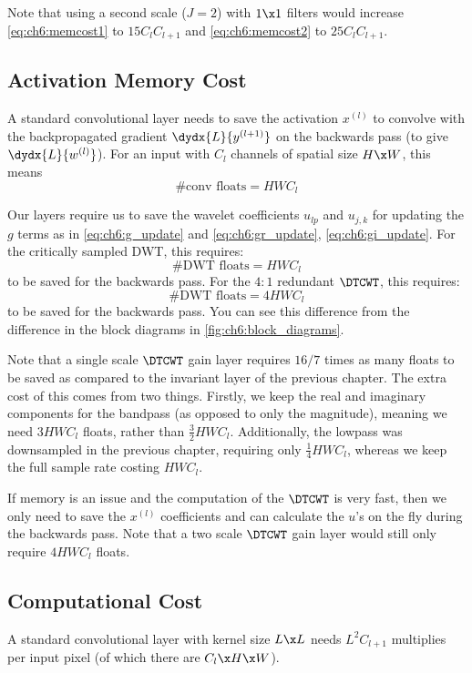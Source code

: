 Note that using a second scale ($J=2$) with $1\x 1$ filters would increase
\eqref{eq:ch6:memcost1} to $15C_lC_{l+1}$ and \eqref{eq:ch6:memcost2} to
$25C_lC_{l+1}$.  

\subsection{Activation Memory Cost}\label{sec:ch6:act_memory}
A standard convolutional layer needs to save the activation $x^{(l)}$ to
convolve with the backpropagated gradient $\dydx{L}{y^{(l+1)}}$ on the backwards
pass (to give $\dydx{L}{w^{(l)}}$). For an input with $C_l$ channels of spatial
size $H\x W$, this means
%
\begin{equation}
  \text{#conv floats} = HWC_l 
\end{equation}

Our layers require us to save the wavelet coefficients $u_{lp}$ and  $u_{j,k}$
for updating the $g$ terms as in \eqref{eq:ch6:g_update} and
\eqref{eq:ch6:gr_update}, \eqref{eq:ch6:gi_update}.  For the critically sampled
DWT, this requires:
%
\begin{equation}
  \text{#DWT floats} = HWC_l 
\end{equation}
%
to be saved for the backwards pass. For the $4:1$ redundant $\DTCWT$, this 
requires:
%
\begin{equation}
  \text{#DWT floats} = 4HWC_l 
\end{equation}
%
to be saved for the backwards pass.  You can see this difference from the
difference in the block diagrams in \autoref{fig:ch6:block_diagrams}.

Note that a single scale $\DTCWT$ gain layer requires $16/7$ times as many
floats to be saved as compared to the invariant layer of the previous chapter.
The extra cost of this comes from two things. Firstly, we keep the real and
imaginary components for the bandpass (as opposed to only the magnitude),
meaning we need $3HWC_l$ floats, rather than $\frac{3}{2}HWC_l$. Additionally,
the lowpass was downsampled in the previous chapter, requiring only
$\frac{1}{4}HWC_l$, whereas we keep the full sample rate costing $HWC_l$.

If memory is an issue and the computation of the $\DTCWT$ is very fast, then we
only need to save the $x^(l)$ coefficients and can calculate the $u$'s on the
fly during the backwards pass. Note that a two scale $\DTCWT$ gain layer would
still only require $4HWC_l$ floats.

\subsection{Computational Cost}\label{sec:ch6:computation}
A standard convolutional layer with kernel size $L\x L$ needs $L^2C_{l+1}$
multiplies per input pixel (of which there are $C_{l}\x H\x W$).


